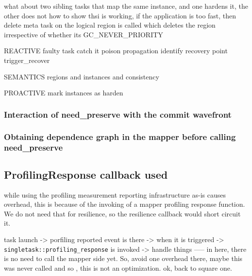 what about two sibling tasks that map the same instance, and one hardens it, the other does not
how to show thsi is working, if the application is too fast, then delete meta task on the logical region is called which deletes the region irrespective of whether its GC_NEVER_PRIORITY

REACTIVE
faulty task
   catch it
   poison propagation
   identify recovery point
   trigger_recover

SEMANTICS
regions and instances and consistency

PROACTIVE
    mark instances as harden

\subsubsection{Interaction of need\_preserve with the commit wavefront}
\subsubsection{Obtaining dependence graph in the mapper before calling need\_preserve} 


\subsection{ProfilingResponse callback used}
while using the profiling measurement reporting infrastructure as-is causes overhead, this is because of the invoking of a mapper profiling response function. We do not need that for resilience, so the resilience callback would short circuit it.

task launch -> porfiling reported event is there -> when it is triggered -> \texttt{singletask::profiling\_response} is invoked -> handle things
   ----- in here, there is no need to call the mapper side yet. So, avoid one overhead there, maybe this was never called and so , this is not an optimization. ok, back to square one. 

 
